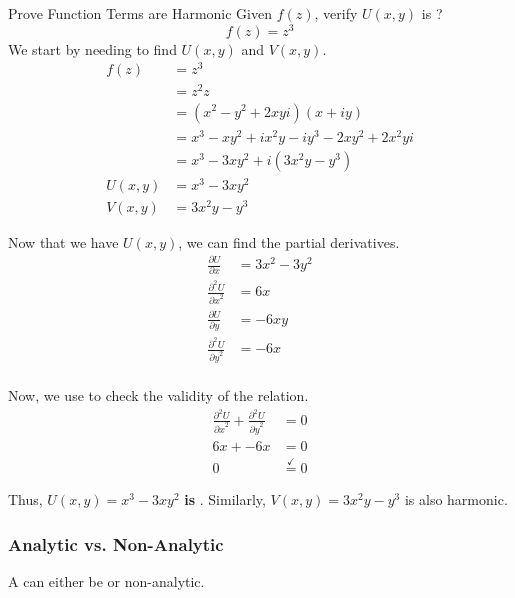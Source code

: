 \begin{example}[Lecture 5]{Prove Function Terms are Harmonic}
  Given $f(z)$, verify $U(x, y)$ is ?
  \begin{equation*}
    f(z) = z^{3}
  \end{equation*}
  \tcblower{}
  We start by needing to find $U(x, y)$ and $V(x, y)$.
  \begin{align*}
    f(z) &= z^{3} \\
         &= z^{2} z \\
         &= \left( x^{2} - y^{2} + 2xyi \right) (x + iy) \\
         &= x^{3} - xy^{2} + ix^{2}y - iy^{3} - 2xy^{2} + 2x^{2}yi \\
         &= x^{3} - 3xy^{2} + i \left( 3x^{2}y - y^{3} \right) \\
    U(x, y) &= x^{3} - 3xy^{2} \\
    V(x, y) &= 3x^{2}y - y^{3}
  \end{align*}

  Now that we have $U(x, y)$, we can find the partial derivatives.
  \begin{align*}
    \frac{\partial U}{\partial x} &= 3x^{2} - 3y^{2} \\
    \frac{\partial^{2} U}{{\partial x}^{2}} &= 6x \\
    \frac{\partial U}{\partial y} &= -6xy \\
    \frac{\partial^{2} U}{{\partial y}^{2}} &= -6x \\
  \end{align*}

  Now, we use  to check the validity of the  relation.
  \begin{align*}
    \frac{\partial^{2} U}{{\partial x}^{2}} + \frac{\partial^{2} U}{{\partial y}^{2}} &= 0 \\
    6x + -6x &= 0 \\
    0 &\overset{\checkmark}{=} 0
  \end{align*}

  Thus, $U(x, y) = x^{3} - 3xy^{2}$ \textbf{is} .
  Similarly, $V(x, y) = 3x^{2}y - y^{3}$ is also harmonic.
\end{example}

\subsubsection{Analytic vs. Non-Analytic}\label{subsubsec:Analytic_NonAnalytic}
A  can either be  or non-analytic.

